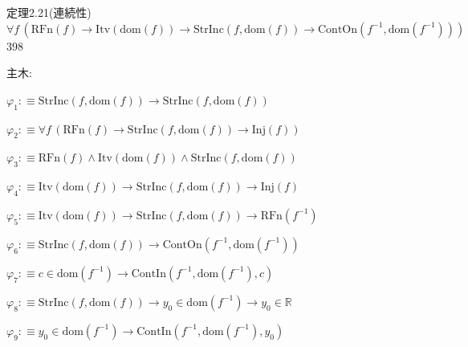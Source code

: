 \begin{fullproof}{定理2.21(連続性)}{$\forall f\,(\mathrm{RFn}(f) \to \mathrm{Itv}(\mathrm{dom}(f)) \to \mathrm{StrInc}(f,\mathrm{dom}(f)) \to \mathrm{ContOn}(f^{-1},\mathrm{dom}(f^{-1})))$}{398}
\begin{ptree}
\noLine
{}
\end{ptree}
\noindent 主木:
\begin{ptree}
\noLine
{}
\noLine
{}
\end{ptree}
\begin{abbrevlist}
\item $\varphi_{1} :\equiv \mathrm{StrInc}(f,\mathrm{dom}(f)) \to \mathrm{StrInc}(f,\mathrm{dom}(f))$
\item $\varphi_{2} :\equiv \forall f\,(\mathrm{RFn}(f) \to \mathrm{StrInc}(f,\mathrm{dom}(f)) \to \mathrm{Inj}(f))$
\item $\varphi_{3} :\equiv \mathrm{RFn}(f) \land \mathrm{Itv}(\mathrm{dom}(f)) \land \mathrm{StrInc}(f,\mathrm{dom}(f))$
\item $\varphi_{4} :\equiv \mathrm{Itv}(\mathrm{dom}(f)) \to \mathrm{StrInc}(f,\mathrm{dom}(f)) \to \mathrm{Inj}(f)$
\item $\varphi_{5} :\equiv \mathrm{Itv}(\mathrm{dom}(f)) \to \mathrm{StrInc}(f,\mathrm{dom}(f)) \to \mathrm{RFn}(f^{-1})$
\item $\varphi_{6} :\equiv \mathrm{StrInc}(f,\mathrm{dom}(f)) \to \mathrm{ContOn}(f^{-1},\mathrm{dom}(f^{-1}))$
\item $\varphi_{7} :\equiv c \in \mathrm{dom}(f^{-1}) \to \mathrm{ContIn}(f^{-1},\mathrm{dom}(f^{-1}),c)$
\item $\varphi_{8} :\equiv \mathrm{StrInc}(f,\mathrm{dom}(f)) \to y_{0} \in \mathrm{dom}(f^{-1}) \to y_{0} \in \mathbb{R}$
\item $\varphi_{9} :\equiv y_{0} \in \mathrm{dom}(f^{-1}) \to \mathrm{ContIn}(f^{-1},\mathrm{dom}(f^{-1}),y_{0})$

\end{abbrevlist}
\end{fullproof}
